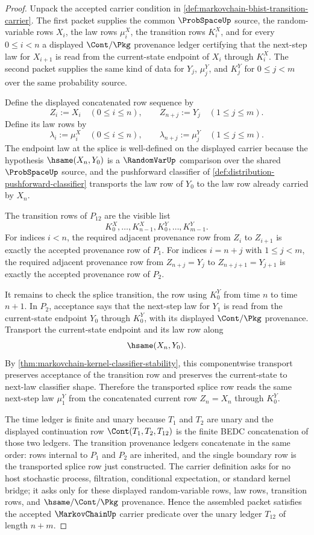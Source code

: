 \begin{proof}
Unpack the accepted carrier condition in \autoref{def:markovchain-bhist-transition-carrier}. The first packet supplies the common $\ProbSpaceUp$ source, the random-variable rows $X_i$, the law rows $\mu^X_i$, the transition rows $K^X_i$, and for every $0\leq i<n$ a displayed $\Cont/\Pkg$ provenance ledger certifying that the next-step law for $X_{i+1}$ is read from the current-state endpoint of $X_i$ through $K^X_i$. The second packet supplies the same kind of data for $Y_j$, $\mu^Y_j$, and $K^Y_j$ for $0\leq j<m$ over the same probability source.

Define the displayed concatenated row sequence by
$$
Z_i:=X_i\quad(0\leq i\leq n),
\qquad
Z_{n+j}:=Y_j\quad(1\leq j\leq m).
$$
Define its law rows by
$$
\lambda_i:=\mu^X_i\quad(0\leq i\leq n),
\qquad
\lambda_{n+j}:=\mu^Y_j\quad(1\leq j\leq m).
$$
The endpoint law at the splice is well-defined on the displayed carrier because the hypothesis $\hsame(X_n,Y_0)$ is a $\RandomVarUp$ comparison over the shared $\ProbSpaceUp$ source, and the pushforward classifier of \autoref{def:distribution-pushforward-classifier} transports the law row of $Y_0$ to the law row already carried by $X_n$.

The transition rows of $P_{12}$ are the visible list
$$
K^X_0,\ldots,K^X_{n-1},K^Y_0,\ldots,K^Y_{m-1}.
$$
For indices $i<n$, the required adjacent provenance row from $Z_i$ to $Z_{i+1}$ is exactly the accepted provenance row of $P_1$. For indices $i=n+j$ with $1\leq j<m$, the required adjacent provenance row from $Z_{n+j}=Y_j$ to $Z_{n+j+1}=Y_{j+1}$ is exactly the accepted provenance row of $P_2$.

It remains to check the splice transition, the row using $K^Y_0$ from time $n$ to time $n+1$. In $P_2$, acceptance says that the next-step law for $Y_1$ is read from the current-state endpoint $Y_0$ through $K^Y_0$, with its displayed $\Cont/\Pkg$ provenance. Transport the current-state endpoint and its law row along
$$
\hsame(X_n,Y_0).
$$
By \autoref{thm:markovchain-kernel-classifier-stability}, this componentwise transport preserves acceptance of the transition row and preserves the current-state to next-law classifier shape. Therefore the transported splice row reads the same next-step law $\mu^Y_1$ from the concatenated current row $Z_n=X_n$ through $K^Y_0$.

The time ledger is finite and unary because $T_1$ and $T_2$ are unary and the displayed continuation row $\Cont(T_1,T_2,T_{12})$ is the finite BEDC concatenation of those two ledgers. The transition provenance ledgers concatenate in the same order: rows internal to $P_1$ and $P_2$ are inherited, and the single boundary row is the transported splice row just constructed. The carrier definition asks for no host stochastic process, filtration, conditional expectation, or standard kernel bridge; it asks only for these displayed random-variable rows, law rows, transition rows, and $\hsame/\Cont/\Pkg$ provenance. Hence the assembled packet satisfies the accepted $\MarkovChainUp$ carrier predicate over the unary ledger $T_{12}$ of length $n+m$.
\end{proof}

